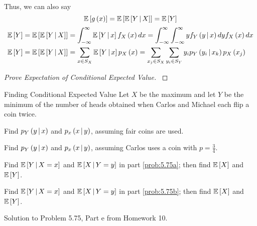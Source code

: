 \begin{definition}
\begin{remark}
    Thus, we can also say
    \begin{equation}\label{eq:Expected Value of Conditional Expected Value of Multiple Variables}
      \operatorname{\operatorname{\mathbb{E}}} \left[ g \left( x \right) \right] = \operatorname{\operatorname{\mathbb{E}}} \left[ \operatorname{\operatorname{\mathbb{E}}} \left[ Y \operatorname{\vert} X \right] \right] = \operatorname{\operatorname{\mathbb{E}}} \left[ Y \right]
    \end{equation}
    \begin{subequations}
      \begin{align}\label{eq:Joint PDF of Multiple Continuous Random Variables}
        \operatorname{\operatorname{\mathbb{E}}} \left[ Y \right]
        = \operatorname{\operatorname{\mathbb{E}}} \left[ \operatorname{\operatorname{\mathbb{E}}} \left[ Y \operatorname{\vert} X \right] \right]
        &= \int_{-\infty}^{\infty} \operatorname{\operatorname{\mathbb{E}}} \left[ Y \operatorname{\vert} x \right] f_{X} \left( x \right) dx
          = \int_{-\infty}^{\infty} \int_{-\infty}^{\infty} y f_{Y} \left( y \operatorname{\vert} x \right) dy f_{X} \left( x \right) dx \\
       \label{eq:Joint PDF of Multiple Discrete Random Variables}
        \operatorname{\operatorname{\mathbb{E}}} \left[ Y \right]
        = \operatorname{\operatorname{\mathbb{E}}} \left[ \operatorname{\operatorname{\mathbb{E}}} \left[ Y \operatorname{\vert} X \right] \right]
        &= \sum_{x \in S_{X}} \operatorname{\operatorname{\mathbb{E}}} \left[ Y \operatorname{\vert} x \right] p_{X} \left( x \right)
          = \sum_{x_{j} \in S_{X}} \sum_{y_{i} \in S_{Y}} y_{i} p_{Y} \left( y_{i} \operatorname{\vert} x_{k} \right) p_{X} \left( x_{j} \right)
      \end{align}
    \end{subequations}
  \end{remark}
\end{definition}
\begin{proof}[Prove Expectation of Conditional Expected Value]\label{proof:Expected Value of Conditional Expected Value of Multiple Variables}
\end{proof}
\begin{example}[Problem 5.75]{Finding Conditional Expected Value}
  Let $X$ be the maximum and let $Y$ be the minimum of the number of heads obtained when Carlos and Michael each flip a coin twice.
  \begin{boldalphlist}
  \item Find $p_{Y} \left( y \operatorname{\vert} x \right)$ and $p_{x} \left( x \operatorname{\vert} y \right)$, assuming fair coins are used.\label{prob:5.75a}
  \item Find $p_{Y} \left( y \operatorname{\vert} x \right)$ and $p_{x} \left( x \operatorname{\vert} y \right)$, assuming Carlos uses a coin with $p = \frac{3}{4}$.\label{prob:5.75b}
  \item Find $\operatorname{\operatorname{\mathbb{E}}} \left[ Y \operatorname{\vert} X=x \right]$ and $\operatorname{\operatorname{\mathbb{E}}} \left[ X \operatorname{\vert} Y=y \right]$ in part \ref{prob:5.75a}; then find $\operatorname{\operatorname{\mathbb{E}}} \left[ X \right]$ and $\operatorname{\operatorname{\mathbb{E}}} \left[ Y \right]$.
  \item Find $\operatorname{\operatorname{\mathbb{E}}} \left[ Y \operatorname{\vert} X=x \right]$ and $\operatorname{\operatorname{\mathbb{E}}} \left[ X \operatorname{\vert} Y=y \right]$ in part \ref{prob:5.75b}; then find $\operatorname{\operatorname{\mathbb{E}}} \left[ X \right]$ and $\operatorname{\operatorname{\mathbb{E}}} \left[ Y \right]$.
  \end{boldalphlist}

  \tcblower

  Solution to Problem 5.75, Part e from Homework 10.
\end{example}
